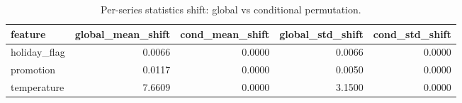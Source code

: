 \begin{table}
\caption{Per-series statistics shift: global vs conditional permutation.}
\label{tab:01_ood_mean_shift}
\begin{tabular}{lrrrr}
\toprule
feature & global_mean_shift & cond_mean_shift & global_std_shift & cond_std_shift \\
\midrule
holiday_flag & 0.0066 & 0.0000 & 0.0066 & 0.0000 \\
promotion & 0.0117 & 0.0000 & 0.0050 & 0.0000 \\
temperature & 7.6609 & 0.0000 & 3.1500 & 0.0000 \\
\bottomrule
\end{tabular}
\end{table}
